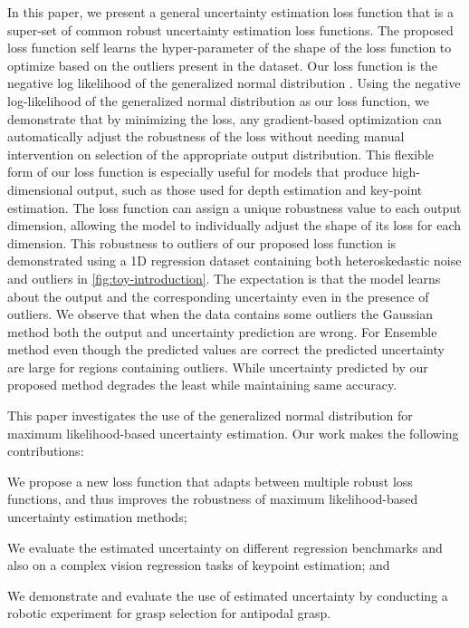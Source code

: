 \documentclass[letterpaper, 10 pt, conference]{ieeeconf}  %
\begin{document}
In this paper, we present a general uncertainty estimation loss function that is a super-set of common robust uncertainty estimation loss functions.
The proposed loss function self learns the hyper-parameter of the shape of the loss function to optimize based on the outliers present in the dataset.
Our loss function is the negative log likelihood of the generalized normal distribution \cite{nadarajah2005generalized} . 
Using the negative log-likelihood of the generalized normal distribution as our loss function, we demonstrate that by minimizing the loss, any gradient-based optimization can automatically adjust the robustness of the loss without needing manual intervention on selection of the appropriate output distribution.
This flexible form of our loss function is especially useful for models that produce high-dimensional output, such as those used for depth estimation and key-point estimation. The loss function can assign a unique robustness value to each output dimension, allowing the model to individually adjust the shape of its loss for each dimension. This robustness to outliers of our proposed loss function is demonstrated using a 1D regression dataset containing both heteroskedastic noise and outliers in \cref{fig:toy-introduction}. 
The expectation is that the model learns about the output and the corresponding uncertainty even in the presence of outliers.
We observe that when the data contains some outliers the Gaussian method both the output and uncertainty prediction are wrong. For Ensemble method even though the predicted values are correct the predicted uncertainty are large for regions containing outliers.
While uncertainty predicted by our proposed method degrades the least while maintaining same accuracy.

This paper investigates the use of the generalized normal distribution \cite{nadarajah2005generalized} for maximum likelihood-based uncertainty estimation. Our work makes the following contributions:
\begin{compactenum}
	\item We propose a new loss function that adapts between multiple robust loss functions, and thus improves the robustness of maximum likelihood-based uncertainty estimation methods;\par
	\item We evaluate the estimated uncertainty on different regression benchmarks and also on a complex vision regression tasks of keypoint estimation; and\par
	\item We demonstrate and evaluate the use of estimated uncertainty by conducting a robotic experiment for grasp selection for antipodal grasp.\par
\end{compactenum}
\end{document}
